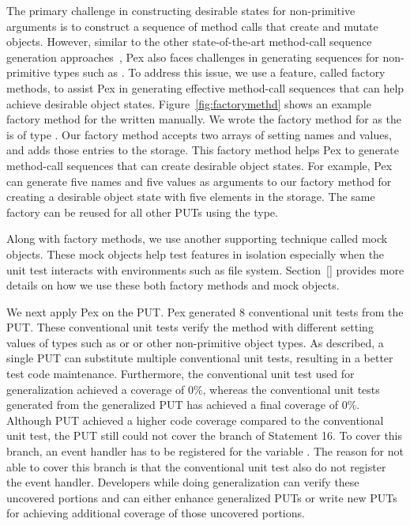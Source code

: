 The primary challenge in constructing desirable states for non-primitive arguments is to construct a sequence of method calls that create and mutate objects. However, similar to the other state-of-the-art method-call sequence generation approaches~\cite{}, Pex also faces challenges in generating sequences for non-primitive types such as . To address this issue, we use a feature, called factory methods, to assist Pex in generating effective method-call sequences that can help achieve desirable object states. Figure~\ref{fig:factorymethd} shows an example factory method for the  written manually. We wrote the factory method for  as the  is of type . Our factory method accepts two arrays of setting names and values, and adds those entries to the storage. This factory method helps Pex to generate method-call sequences that can create desirable object states. For example, Pex can generate five names and five values as arguments to our factory method for creating a desirable object state with five elements in the storage. The same factory can be reused for all other PUTs using the  type.

Along with factory methods, we use another supporting technique called mock objects. These mock objects help test features in isolation especially when the unit test interacts with environments such as file system. Section~\ref{} provides more details on how we use these both factory methods and mock objects.


We next apply Pex on the  PUT. Pex generated $8$ conventional unit tests from the  PUT. These conventional unit tests verify the  method with different setting values of types such as  or  or other non-primitive object types. As described, a single PUT can substitute multiple conventional unit tests, resulting in a better test code maintenance. Furthermore, the conventional unit test used for generalization achieved a coverage of $0$\%, whereas the conventional unit tests generated from the generalized PUT has achieved a final coverage of $0$\%. Although PUT achieved a higher code coverage compared to the conventional unit test, the PUT still could not cover the  branch of Statement 16. To cover this branch, an event handler has to be registered for the variable . The reason for not able to cover this branch is that the conventional unit test also do not register the event handler. Developers while doing generalization can verify these uncovered portions and can either enhance generalized PUTs or write new PUTs for achieving additional coverage of those uncovered portions.

